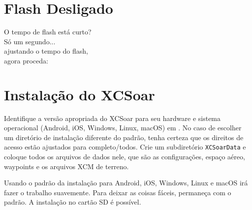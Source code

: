 \documentclass[a4paper,12pt]{refrep}
\begin{document}
\section*{{\color[rgb]{.9,.85,0}Flash} Desligado}

\vspace{2em}
\hspace*{1cm} O tempo de flash está curto?\\
\hspace*{4cm} Só um segundo...\\
\hspace*{6cm} ajustando o tempo do flash,\\
\hspace*{10cm} agora proceda: 


\setlength{\parskip}{0.3\baselineskip}
\newpage
\section{Instalação do XCSoar }\label{ch:XCSinstall}


Identifique a versão apropriada do XCSoar para seu hardware e sistema operacional \textsf{(Android, iOS, Windows, Linux, macOS)}
em \xcsoarwebsite{}.
No caso de escolher um diretório de instalação diferente do padrão, tenha certeza que os direitos de acesso estão ajustados para completo/todos.  Crie um subdiretório \texttt{XCSoarData} e coloque todos os arquivos de dados nele, que são as configurações, espaço aéreo, waypoints e os arquivos XCM de terreno.

Usando o padrão da instalação para Android, iOS, Windows, Linux e macOS irá fazer o trabalho suavemente.  Para deixar as coisas fáceis, permaneça com o padrão.  A instalação no cartão SD é possível.
\end{document}

